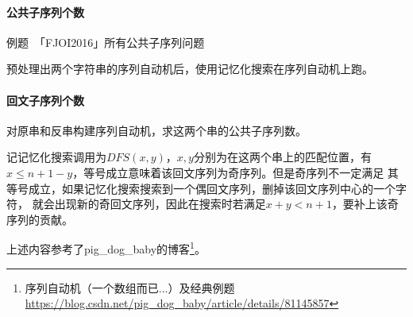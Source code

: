 \paragraph{公共子序列个数}
例题~「FJOI2016」所有公共子序列问题

预处理出两个字符串的序列自动机后，使用记忆化搜索在序列自动机上跑。
\paragraph{回文子序列个数}
对原串和反串构建序列自动机，求这两个串的公共子序列数。

记记忆化搜索调用为$DFS(x,y)$，$x,y$分别为在这两个串上的匹配位置，有
$x\leq n+1-y$，等号成立意味着该回文序列为奇序列。但是奇序列不一定满足
其等号成立，如果记忆化搜索搜索到一个偶回文序列，删掉该回文序列中心的一个字符，
就会出现新的奇回文序列，因此在搜索时若满足$x+y<n+1$，要补上该奇序列的贡献。

上述内容参考了pig\_dog\_baby的博客\footnote{
    序列自动机（一个数组而已...）及经典例题
    \url{https://blog.csdn.net/pig\_dog\_baby/article/details/81145857}
}。
